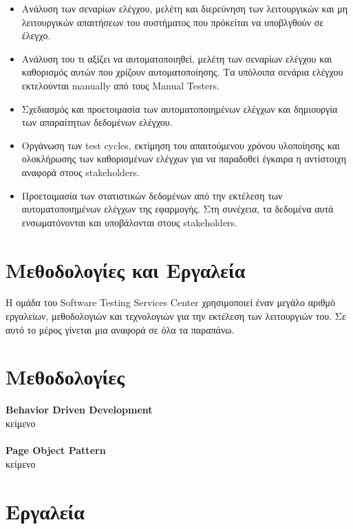 \begin{itemize}
    \item Ανάλυση των σεναρίων ελέγχου, μελέτη και διερεύνηση των λειτουργικών και μη λειτουργικών απαιτήσεων του συστήματος που πρόκείται να υποβλγθούν σε έλεγχο.
    \item Ανάλυση του τι αξίζει να αυτοματοποιηθεί, μελέτη των σεναρίων ελέγχου και καθορισμός αυτών που χρίζουν αυτοματοποίησης. Τα υπόλοιπα σενάρια ελέγχου εκτελούνται manually από τους Manual Testers.
    \item Σχεδιασμός και προετοιμασία των αυτοματοποιημένων ελέγχων και δημιουργία των απαραίτητων δεδομένων ελέγχου.
    \item Οργάνωση των test cycles, εκτίμηση του απαιτούμενου χρόνου υλοποίησης και ολοκλήρωσης των καθορισμένων ελέγχων για να παραδοθεί έγκαιρα η αντίστοιχη αναφορά στους stakeholders.
    \item Προετοιμασία των στατιστικών δεδομένων από την εκτέλεση των αυτοματοποιημένων ελέγχων της εφαρμογής. Στη συνέχεια, τα δεδομένα αυτά ενσωματόνονται και υποβάλονται στους stakeholders.
\end{itemize}

\section*{Μεθοδολογίες και Εργαλεία}

Η ομάδα του Software Testing Services Center χρησιμοποιεί έναν μεγάλο αριθμό εργαλείων, μεθοδολογιών και τεχνολογιών για την εκτέλεση των λειτουργιών του. Σε αυτό το μέρος γίνεται μια αναφορά σε όλα τα παραπάνω.\\

\section*{Μεθοδολογίες}
\textbf{Behavior Driven Development}\\
κείμενο\\ \\
\textbf{Page Object Pattern}\\
κείμενο\\
\section*{Εργαλεία}

